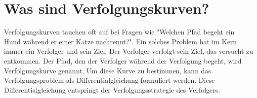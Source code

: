 %
%
%
\section{Was sind Verfolgungskurven?
\label{lambertw:section:Was_sind_Verfolgungskurven}}
%
Verfolgungskurven tauchen oft auf bei Fragen wie "Welchen Pfad begeht ein Hund während er einer Katze nachrennt?".
Ein solches Problem hat im Kern immer ein Verfolger und sein Ziel.
Der Verfolger verfolgt sein Ziel, das versucht zu entkommen.
Der Pfad, den der Verfolger während der Verfolgung begeht, wird Verfolgungskurve genannt.
Um diese Kurve zu bestimmen, kann das Verfolgungsproblem als Differentialgleichung formuliert werden.
Diese Differentialgleichung entspringt der Verfolgungsstrategie des Verfolgers.
%
